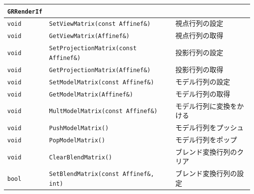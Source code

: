 \begin{center}
\begin{tabular}{p{.1\hsize}p{.5\hsize}p{.3\hsize}}
\texttt{GRRenderIf}	& & 										\\ \midrule
\texttt{void} & \texttt{SetViewMatrix(const Affinef\&)}			& 視点行列の設定	\\
\texttt{void} & \texttt{GetViewMatrix(Affinef\&)}				& 視点行列の取得	\\
\texttt{void} & \texttt{SetProjectionMatrix(const Affinef\&)}	& 投影行列の設定	\\
\texttt{void} & \texttt{GetProjectionMatrix(Affinef\&)}			& 投影行列の取得	\\
\texttt{void} & \texttt{SetModelMatrix(const Affinef\&)}		& モデル行列の設定	\\
\texttt{void} & \texttt{GetModelMatrix(Affinef\&)}				& モデル行列の取得	\\
\texttt{void} & \texttt{MultModelMatrix(const Affinef\&)}		& モデル行列に変換をかける	\\
\texttt{void} & \texttt{PushModelMatrix()}						& モデル行列をプッシュ	\\
\texttt{void} & \texttt{PopModelMatrix()}						& モデル行列をポップ	\\
\texttt{void} & \texttt{ClearBlendMatrix()}						& ブレンド変換行列のクリア	\\
\texttt{bool} & \texttt{SetBlendMatrix(const Affinef\&, int)}	& ブレンド変換行列の設定	\\
\end{tabular}
\end{center}


